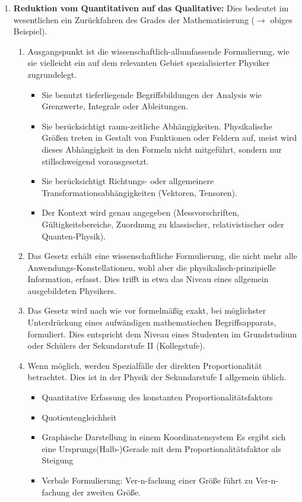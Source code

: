 \begin{enumerate}
	\item \textbf{Reduktion vom Quantitativen auf das Qualitative:} Dies bedeutet im wesentlichen ein Zur\"{u}ckfahren des Grades der Mathematisierung ($\to$ obiges Beispiel).
	
	\begin{enumerate}
		\item
		Ausgangspunkt ist die wissenschaftlich-allumfassende Formulierung,
		wie sie vielleicht ein auf dem relevanten Gebiet spezialisierter
		Physiker zugrundelegt.
		\begin{itemize}
			\item
			Sie benutzt tieferliegende Begriffsbildungen der Analysis wie
			Grenzwerte, Integrale oder Ableitungen.
			
			\item
			Sie ber\"{u}cksichtigt raum-zeitliche Abh\"{a}ngigkeiten.
			Physikalische Gr\"{o}{\ss}en
			treten in Gestalt von Funktionen oder Feldern auf, meist wird
			dieses Abh\"{a}ngigkeit in den Formeln nicht mitgef\"{u}hrt,
			sondern nur stillschweigend vorausgesetzt.
			\item
			Sie ber\"{u}cksichtigt Richtungs- oder allgemeinere
			Trans\-for\-mations\-ab\-h\"{a}ngig\-kei\-ten (Vektoren, Tensoren).
			\item
			Der Kontext wird genau angegeben (Messvorschriften,
			G\"{u}ltigkeitsbereiche, Zuordnung zu klassischer,
			relativistischer oder Quanten-Physik).
		\end{itemize}
		
		\item Das Gesetz erh\"{a}lt eine wissenschaftliche Formulierung,
		die nicht mehr alle An\-wen\-dungs-Kon\-stella\-tio\-nen,
		wohl aber die physikalisch-prinzipielle Information, erfasst.
		Dies trifft in etwa das Niveau eines allgemein ausgebildeten
		Physikers.
		
		\item Das Gesetz wird nach wie vor formelm\"{a}{\ss}ig exakt, bei m\"{o}glichster
		Unterdr\"{u}ckung eines aufw\"{a}ndigen mathematischen
		Begriffsapparats, formuliert.
		Dies entspricht dem Niveau eines Studenten im Grundstudium
		oder Sch\"{u}lers der Sekundarstufe II (Kollegstufe).
		
		\item Wenn m\"{o}glich, werden Spezialfälle der direkten Proportionalit\"{a}t betrachtet.
		Dies ist in der Physik der Sekundarstufe I allgemein \"{u}blich.
		\begin{itemize}
			\item Quantitative Erfassung des konstanten
			Pro\-por\-tio\-na\-li\-t\"{a}ts\-fak\-tors
			\item Quotientengleichheit
			\item Graphische Darstellung in einem Koordinatensystem
			Es ergibt sich eine Ur\-sprungs\-(Halb-)Gerade mit dem
			Proportionalit\"{a}tsfaktor als Steigung
			\item Verbale Formulierung: Ver-n-fachung einer Größe führt zu Ver-n-fachung der zweiten Größe.\\
		\end{itemize}
		

\end{enumerate}
\end{enumerate}
